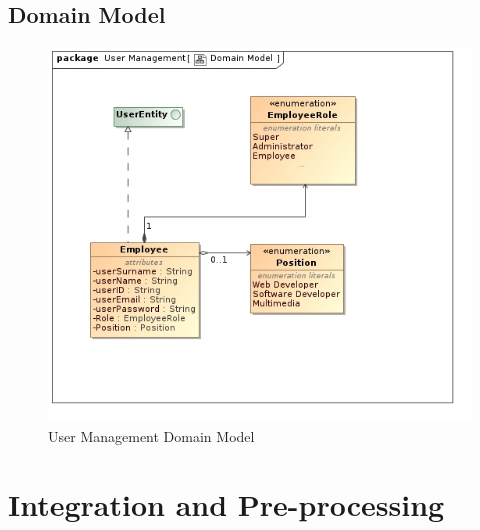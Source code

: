 \documentclass[11pt,a4paper]{article}
\begin{document}
\subsection{Domain Model}
\begin{figure}[H]
	\begin{center}
		\includegraphics[scale=0.75]{../Images/User Domain Model.jpg}
		\caption{User Management Domain Model}
	\end{center}
\end{figure}

\pagebreak

\section{Integration and Pre-processing}
\end{document}

